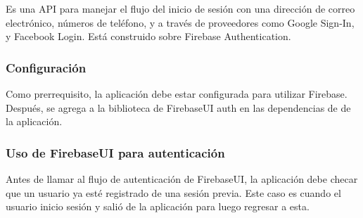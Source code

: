 Es una API para manejar el flujo del inicio de sesión con una
dirección de correo electrónico, números de teléfono, y a través de
proveedores como Google Sign-In, y Facebook Login. Está construido sobre
Firebase Authentication.



\subsubsection{Configuración}
\label{\detokenize{dev_docs:configuracion}}
Como prerrequisito, la aplicación debe estar configurada para utilizar Firebase.
Después, se agrega a la biblioteca de FirebaseUI auth en las dependencias de
 de la aplicación.

%
\begin{sphinxVerbatim}[commandchars=\\\{\}]
 
   
\end{sphinxVerbatim}


\subsubsection{Uso de FirebaseUI para autenticación}
\label{\detokenize{dev_docs:uso-de-firebaseui-para-autenticacion}}
Antes de llamar al flujo de autenticación de FirebaseUI, la aplicación debe
checar que un usuario ya esté registrado de una sesión previa. Este caso
es cuando el usuario inicio sesión y salió de la aplicación para luego regresar
a esta.

%
\begin{sphinxVerbatim}[commandchars=\\\{\}]
   
    
  
\end{sphinxVerbatim}

